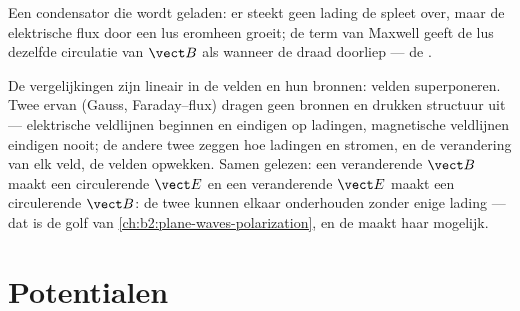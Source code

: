 \begin{omfigure}

{\small Een condensator die wordt geladen: er steekt geen lading de spleet
over, maar de elektrische flux door een lus eromheen groeit; de term van
Maxwell geeft de lus dezelfde circulatie van $\vect B$ als wanneer de draad
doorliep --- de .}
\end{omfigure}

\begin{remark}\label{rem:b2:maxwell-equations:linearity}
De vergelijkingen zijn lineair in de velden en hun bronnen: velden
superponeren. Twee ervan (Gauss, Faraday--flux) dragen geen bronnen en
drukken structuur uit --- elektrische veldlijnen beginnen en eindigen op
ladingen, magnetische veldlijnen eindigen nooit; de andere twee zeggen hoe
ladingen en stromen, en de verandering van elk veld, de velden opwekken.
Samen gelezen: een veranderende $\vect B$ maakt een circulerende $\vect E$
en een veranderende $\vect E$ maakt een circulerende $\vect B$: de twee
kunnen elkaar onderhouden zonder enige lading --- dat is de golf van
\cref{ch:b2:plane-waves-polarization}, en de  maakt haar
mogelijk.
\end{remark}

\section{Potentialen}

